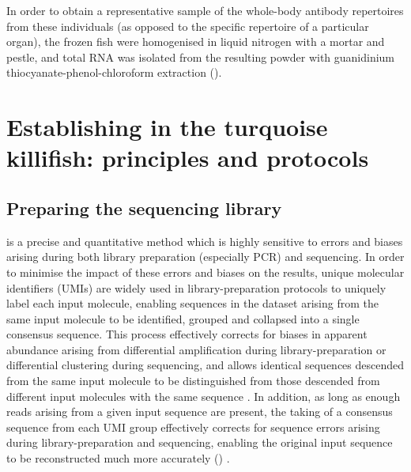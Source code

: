 In order to obtain a representative sample of the whole-body antibody repertoires from these individuals (as opposed to the specific repertoire of a particular organ), the frozen fish were homogenised in liquid nitrogen with a mortar and pestle, and total RNA was isolated from the resulting powder with guanidinium thiocyanate-phenol-chloroform extraction ().

\section{Establishing \igseq in the turquoise killifish: principles and protocols}
\label{sec:igseq_protocol}

\subsection{Preparing the sequencing library}
\label{sec:igseq_protocol_library}

\IGSEQ is a precise and quantitative method which is highly sensitive to errors and biases arising during both library preparation (especially PCR) and sequencing. In order to minimise the impact of these errors and biases on the results, unique molecular identifiers (UMIs) are widely used in \igseq library-preparation protocols \parencite{vollmers2013consensus,turchaninova2016igprep} to uniquely label each input molecule, enabling sequences in the dataset arising from the same input molecule to be identified, grouped and collapsed into a single consensus sequence. This process effectively corrects for biases in apparent abundance arising from differential amplification during library-preparation or differential clustering during sequencing, and allows identical sequences descended from the same input molecule to be distinguished from those descended from different input molecules with the same sequence \parencite{vollmers2013consensus}. In addition, as long as enough reads arising from a given input sequence are present, the taking of a consensus sequence from each UMI group effectively corrects for sequence errors arising during library-preparation and sequencing, enabling the original input sequence to be reconstructed much more accurately () \parencite{vollmers2013consensus,turchaninova2016igprep}.

